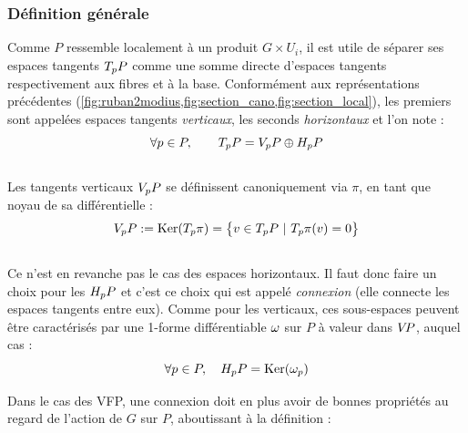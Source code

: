 \subsubsection{Définition générale}\label{subsec:def2conn}

Comme $P$ ressemble localement à un produit $G\times U_i$, il est utile de séparer ses espaces tangents $\tg[p]{P}$ comme une somme directe d'espaces tangents respectivement aux fibres et à la base. Conformément aux représentations précédentes (\cref{fig:ruban2modius,fig:section_cano,fig:section_local}), les premiers sont appelées espaces tangents \emph{verticaux}, les seconds \emph{horizontaux} et l'on note :
\[\forall p\in P,\qquad \tg[p]{P} = \vg[p]{P} \oplus \hg[p]{P}\]
\\
Les tangents verticaux $\vg[p]{P}$ se définissent canoniquement via $\pi$, en tant que noyau de sa différentielle :
\[\vg[p]{P} \defeq \Ker (\tg[p]{\pi}) = \big\{ v\in\tg[p]{P}\ |\ \tg[p]{\pi}(v)=0 \big\}\]
\\ 
Ce n'est en revanche pas le cas des espaces horizontaux. Il faut donc faire un choix pour les $\hg[p]{P}$ et c'est ce choix qui est appelé \emph{connexion} (elle connecte les espaces tangents entre eux).
Comme pour les verticaux, ces sous-espaces peuvent être caractérisés par une 1-forme différentiable $\conn$ sur $P$ à valeur dans $\vg{P}$, auquel cas :
\[\forall p\in P,\quad \hg[p]{P} = \Ker(\conn_p)\]
\skipl

Dans le cas des VFP, une connexion doit en plus avoir de bonnes propriétés au regard de l'action de $G$ sur $P$, aboutissant à la définition :


